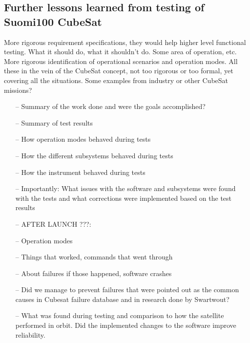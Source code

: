 \documentclass[english,12pt,a4paper,pdftex,elec,utf8]{aaltothesis}
\begin{document}
\subsection{Further lessons learned from testing of Suomi100 CubeSat}
More rigorous requirement specifications, they would help higher level functional testing.
What it should do, what it shouldn't do. Some area of operation, etc. More rigorous identification of operational scenarios and operation modes. All these in the vein of the CubeSat concept, not too rigorous or too formal, yet covering all the situations. Some examples from industry or other CubeSat missions?\par  
\begin{itemize}
\item[--]Summary of the work done and were the goals accomplished?
\item[--]Summary of test results
\item[--]How operation modes behaved during tests
\item[--]How the different subsystems behaved during tests
\item[--]How the instrument behaved during tests
\item[--]Importantly: What issues with the software and subsystems were found with the tests and what corrections were implemented based on the test results
\item[--]AFTER LAUNCH ???:
\item[--]Operation modes
\item[--]Things that worked, commands that went through
\item[--]About failures if those happened, software crashes
\item[--]Did we manage to prevent failures that were pointed out as the common causes in Cubesat failure database and in research done by Swartwout?
\item[--]What was found during testing and comparison to how the satellite performed in orbit. Did the implemented changes to the software improve reliability.
\end{itemize}




\clearpage
\end{document}
